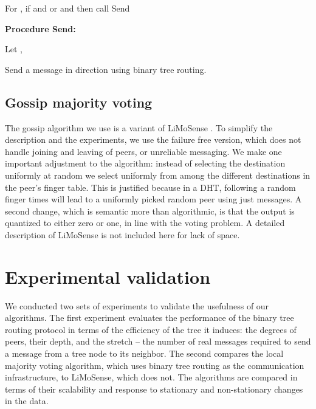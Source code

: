 \documentclass[12pt,english,journal]{elsarticle}
\numberwithin{equation}{section}
\numberwithin{figure}{section}
\theoremstyle{plain}
\theoremstyle{plain}
\begin{document}
\begin{algorithm}
\noindent \begin{raggedright}
For , if 
and 
or  and 
then call Send
\par\end{raggedright}

\noindent \begin{raggedright}
\textbf{Procedure Send:}
\par\end{raggedright}

\noindent \begin{raggedright}
Let , 
\par\end{raggedright}

\noindent \raggedright{}Send a message 
in direction  using binary tree routing.
\end{algorithm}



\subsection{Gossip majority voting}

The gossip algorithm we use is a variant of LiMoSense \citep{dynamicGossip}.
To simplify the description and the experiments, we use the failure
free version, which does not handle joining and leaving of peers,
or unreliable messaging. We make one important adjustment to the algorithm:
instead of selecting the destination uniformly at random we select
uniformly from among the different destinations in the peer's finger
table. This is justified because in a DHT, following a random finger
 times will lead to a uniformly picked random
peer using just  messages. A second change,
which is semantic more than algorithmic, is that the output is quantized
to either zero or one, in line with the voting problem. A detailed
description of LiMoSense is not included here for lack of space.




\section{\label{sec:Experimentation}Experimental validation}

We conducted two sets of experiments to validate the usefulness of
our algorithms. The first experiment evaluates the performance of
the binary tree routing protocol in terms of the efficiency of the
tree it induces: the degrees of peers, their depth, and the stretch
-- the number of real messages required to send a message from a tree
node to its neighbor. The second compares the local majority voting
algorithm, which uses binary tree routing as the communication infrastructure,
to LiMoSense, which does not. The algorithms are compared in terms
of their scalability and response to stationary and non-stationary
changes in the data. 
\end{document}
